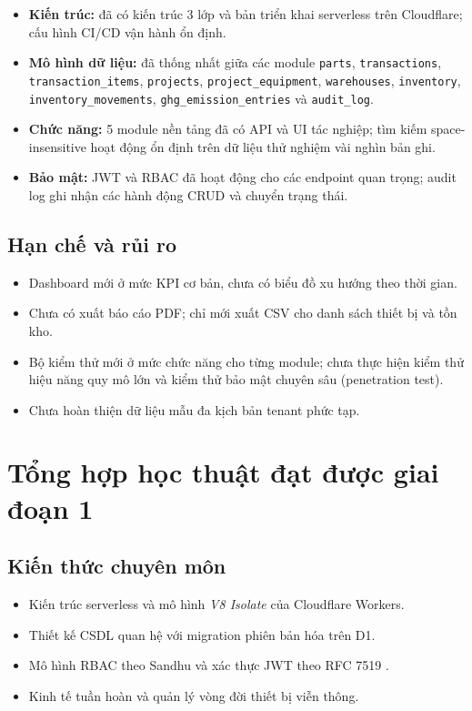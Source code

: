 \begin{itemize}[leftmargin=1.2cm]
    \item \textbf{Kiến trúc:} đã có kiến trúc 3 lớp và bản triển khai serverless trên Cloudflare; cấu hình CI/CD vận hành ổn định.
    \item \textbf{Mô hình dữ liệu:} đã thống nhất giữa các module \texttt{parts}, \texttt{transactions}, \texttt{transaction\_items}, \texttt{projects}, \texttt{project\_equipment}, \texttt{warehouses}, \texttt{inventory}, \texttt{inventory\_movements}, \texttt{ghg\_emission\_entries} và \texttt{audit\_log}.
    \item \textbf{Chức năng:} 5 module nền tảng đã có API và UI tác nghiệp; tìm kiếm space-insensitive hoạt động ổn định trên dữ liệu thử nghiệm vài nghìn bản ghi.
    \item \textbf{Bảo mật:} JWT và RBAC đã hoạt động cho các endpoint quan trọng; audit log ghi nhận các hành động CRUD và chuyển trạng thái.
\end{itemize}

\subsection{Hạn chế và rủi ro}
\begin{itemize}[leftmargin=1.2cm]
    \item Dashboard mới ở mức KPI cơ bản, chưa có biểu đồ xu hướng theo thời gian.
    \item Chưa có xuất báo cáo PDF; chỉ mới xuất CSV cho danh sách thiết bị và tồn kho.
    \item Bộ kiểm thử mới ở mức chức năng cho từng module; chưa thực hiện kiểm thử hiệu năng quy mô lớn và kiểm thử bảo mật chuyên sâu (penetration test).
    \item Chưa hoàn thiện dữ liệu mẫu đa kịch bản tenant phức tạp.
\end{itemize}

\section{Tổng hợp học thuật đạt được giai đoạn 1}
\subsection{Kiến thức chuyên môn}
\begin{itemize}[leftmargin=1.2cm]
    \item Kiến trúc serverless và mô hình \emph{V8 Isolate} của Cloudflare Workers.
    \item Thiết kế CSDL quan hệ với migration phiên bản hóa trên D1.
    \item Mô hình RBAC theo Sandhu \cite{sandhu1996rbac} và xác thực JWT theo RFC 7519 \cite{rfc7519}.
    \item Kinh tế tuần hoàn và quản lý vòng đời thiết bị viễn thông.
\end{itemize}


